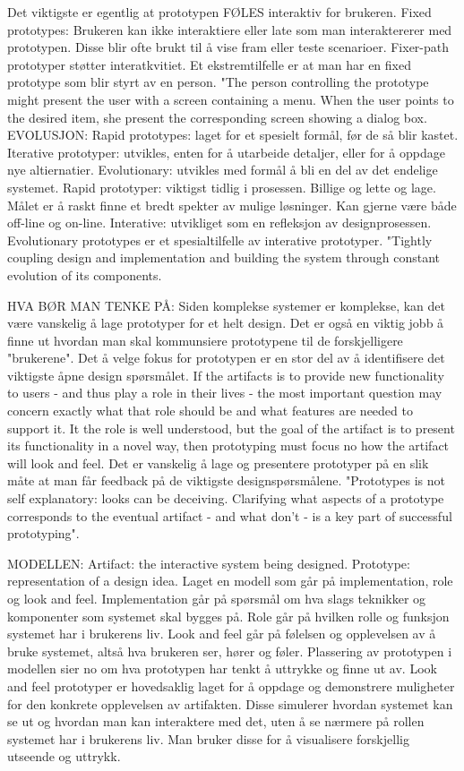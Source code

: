 Det viktigste er egentlig at prototypen FØLES interaktiv for brukeren. Fixed prototypes: Brukeren kan ikke interaktiere eller late som man interaktererer med prototypen. Disse blir ofte brukt til å vise fram eller teste scenarioer. Fixer-path prototyper støtter interatkvitiet. Et ekstremtilfelle er at man har en fixed prototype som blir styrt av en person. "The person controlling the prototype might present the user with a screen containing a menu. When the user points to the desired item, she present the corresponding screen showing a dialog  box. EVOLUSJON: Rapid prototypes: laget for et spesielt formål, før de så blir kastet. Iterative prototyper: utvikles, enten for å utarbeide detaljer, eller for å oppdage nye altiernatier. Evolutionary: utvikles med formål å bli en del av det endelige systemet. Rapid prototyper: viktigst tidlig i prosessen. Billige og lette og lage. Målet er å raskt finne et bredt spekter av mulige løsninger. Kan gjerne være både off-line og on-line. Interative: utvikliget som en refleksjon av designprosessen. Evolutionary prototypes er et spesialtilfelle av interative prototyper. "Tightly coupling design and implementation and building the system through constant evolution of its components.


HVA BØR MAN TENKE PÅ:
Siden komplekse systemer er komplekse, kan det være vanskelig å lage prototyper for et helt design. Det er også en viktig jobb å finne ut hvordan man skal kommunsiere prototypene til de forskjelligere "brukerene". Det å velge fokus for prototypen er en stor del av å identifisere det viktigste åpne design spørsmålet. If the artifacts is to provide new functionality to users - and thus play a role in their lives - the most important question may concern exactly what that role should be and what features are needed to support it. It the role is well understood, but the goal of the artifact is to present its functionality in a novel way, then prototyping must focus no how the artifact will look and feel.
Det er vanskelig å lage og presentere prototyper på en slik måte at man får feedback på de viktigste designspørsmålene. "Prototypes is not self explanatory: looks can be deceiving. Clarifying what aspects of a prototype corresponds to the eventual artifact - and what don't - is a key part of successful prototyping".

MODELLEN:
Artifact: the interactive system being designed. Prototype: representation of a design idea. Laget en modell som går på implementation, role og look and feel. Implementation går på spørsmål om hva slags teknikker og komponenter som systemet skal bygges på. Role går på hvilken rolle og funksjon systemet har i brukerens liv. Look and feel går på følelsen og opplevelsen av å bruke systemet, altså hva brukeren ser, hører og føler. Plassering av prototypen i modellen sier no om hva prototypen har tenkt å uttrykke og finne ut av. Look and feel prototyper er hovedsaklig laget for å oppdage og demonstrere muligheter for den konkrete opplevelsen av artifakten. Disse simulerer hvordan systemet kan se ut og hvordan man kan interaktere med det, uten å se nærmere på rollen systemet har i brukerens liv. Man bruker disse for å visualisere forskjellig utseende og uttrykk. 

